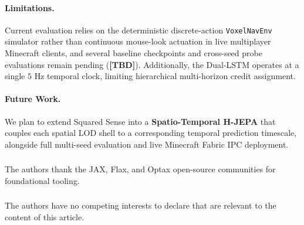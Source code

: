 \documentclass[runningheads]{llncs}
\begin{document}
\paragraph{Limitations.} Current evaluation relies on the deterministic discrete-action \texttt{VoxelNavEnv} simulator rather than continuous mouse-look actuation in live multiplayer Minecraft clients, and several baseline checkpoints and cross-seed probe evaluations remain pending (\textbf{[TBD]}). Additionally, the Dual-LSTM operates at a single $5\text{ Hz}$ temporal clock, limiting hierarchical multi-horizon credit assignment.

\paragraph{Future Work.} We plan to extend Squared Sense into a \textbf{Spatio-Temporal H-JEPA} that couples each spatial LOD shell to a corresponding temporal prediction timescale, alongside full multi-seed evaluation and live Minecraft Fabric IPC deployment.

\begin{credits}
\subsubsection{\ackname} The authors thank the JAX, Flax, and Optax open-source communities for foundational tooling.

\subsubsection{\discintname} The authors have no competing interests to declare that are relevant to the content of this article.
\end{credits}



\end{document}
